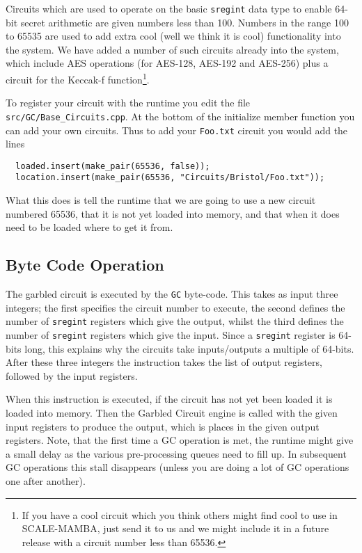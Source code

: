 Circuits which are used to operate on the basic \verb|sregint|
data type to enable 64-bit secret arithmetic are
given numbers less than 100.
Numbers in the range 100 to 65535 are used to add extra
cool (well we think it is cool) functionality into the
system.
We have added a number of such circuits already into the
system, which include AES operations (for AES-128, AES-192
and AES-256) plus a circuit for the Keccak-f function\footnote{If
you have a cool circuit which you think others might find
cool to use in SCALE-MAMBA, just send it to us and we
might include it in a future release with a circuit
number less than 65536.}.

To register your circuit with the runtime you edit the
file \verb|src/GC/Base_Circuits.cpp|. At the bottom of
the initialize member function you can add your
own circuits.
Thus to add your \verb|Foo.txt| circuit you would add
the lines
\begin{lstlisting}
  loaded.insert(make_pair(65536, false));
  location.insert(make_pair(65536, "Circuits/Bristol/Foo.txt"));
\end{lstlisting}
What this does is tell the runtime that we are going to
use a new circuit numbered 65536, that it is not yet loaded
into memory, and that when it does need to be loaded
where to get it from.

\subsection{Byte Code Operation}
The garbled circuit is executed by the \verb|GC| byte-code.
This takes as input three integers; the first specifies
the circuit number to execute, the second defines
the number of \verb|sregint| registers which
give the output, whilst the third defines the number of
\verb|sregint| registers which give the input.
Since a \verb|sregint| register is 64-bits long, this
explains why the circuits take inputs/outputs a multiple
of 64-bits.
After these three integers the instruction takes the list
of output registers, followed by the input registers.

When this instruction is executed, if the circuit has
not yet been loaded it is loaded into memory. Then the
Garbled Circuit engine is called with the given input
registers to produce the output, which is places in the
given output registers.
Note, that the first time a GC operation is met, the
runtime might give a small delay as the various pre-processing
queues need to fill up.
In subsequent GC operations this stall disappears (unless
you are doing a lot of GC operations one after another).

